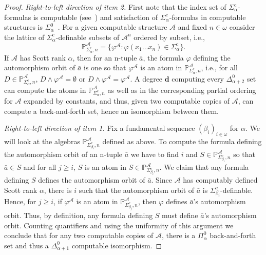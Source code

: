 \documentclass[10pt,a4paper]{amsart}
\newcommand\+[1]{\mathcal{#1}}
\renewcommand\*[1]{\mathbf{#1}}
\renewcommand\=[1]{\text{#1}}
\renewcommand\*[1]{\mathbf{#1}}
\renewcommand{\phi}{\varphi}
\newcommand{\A}{\mathcal{A}}
\newcommand{\Sicom}[1]{\Sigma^{\mathrm{c}}_{#1}}
\newcommand{\nat}{\omega}
\begin{document}
\begin{proof}
  \emph{Right-to-left direction of item 2.} First note that the index set of $\Sicom{\alpha}$-formulas is computable (see~\cite[p.~106]{ash2000}) and satisfaction of $\Sicom{\alpha}$-formulas in computable structures is $\Sigma^0_\alpha$~\cite[Theorem 7.5]{ash2000}. For a given computable structure $\+A$ and fixed $n\in\nat$ consider the lattice of $\Sicom{\alpha}$-definable subsets of $\A^n$ ordered by subset, i.e.,
  \[ \mathbb{P}_{\Sicom{\alpha},n}^{{\+A}}=\{ \phi^\+A: \phi(x_1\dots x_n)\in \Sicom{\alpha}\}.\]
  If $\+A$ has Scott rank $\alpha$, then for an n-tuple $\bar a$, the formula $\phi$ defining the automorphism orbit of $\bar a$ is one so that $\phi^{\+A}$ is an atom in $\mathbb{P}_{\Sicom\alpha,n}^{\+A}$, i.e., for all $D\in \mathbb{P}_{\Sicom\alpha,n}^{\+A}$, $D\land \phi^{\+A}=\emptyset$ or $D\land \phi^{\+A}=\phi^{\+A}$. A degree $\*d$ computing every $\Delta^0_{\alpha+2}$ set can compute the atoms in $\mathbb{P}_{\Sicom\alpha,n}^{\+A}$ as well as in the corresponding partial ordering for $\+A$ expanded by constants, and thus, given two computable copies of $\+A$, can compute a back-and-forth set, hence an isomorphism between them.

  \emph{Right-to-left direction of item 1.} Fix a fundamental sequence $(\beta_i)_{i\in\nat}$ for $\alpha$. We will look at the algebras $\mathbb P_{\Sicom{\beta_i},n}^{{\+A}}$ defined as above. To compute the formula defining the automorphism orbit of an n-tuple $\bar a$ we have to find $i$ and $S\in\mathbb P_{\Sicom{\beta_i},n}^{{\+A}}$ so that $\bar a\in S$ and for all $j\geq i$, $S$ is an atom in $S\in\mathbb P_{\Sicom{\beta_i},n}^{{\+A}}$. We claim that any formula defining $S$ defines the automorphism orbit of $\bar a$. Since $\+A$ has computably defined Scott rank $\alpha$, there is $i$ such that the automorphism orbit of $\bar a$ is $\Sicom{\beta_i}$-definable. Hence, for $j\geq i$, if $\phi^{\+A}$ is an atom in $\mathbb P_{\Sicom{\beta_j},n}^{{\+A}}$, then $\phi$ defines $\bar a$'s automorphism orbit. Thus, by definition, any formula defining $S$ must define $\bar a$'s automorphism orbit. Counting quantifiers and using the uniformity of this argument we conclude that for any two computable copies of $\+A$, there is a $\Pi^0_\alpha$ back-and-forth set and thus a $\Delta^0_{\alpha+1}$ computable isomorphism.


\end{proof}
\end{document}
